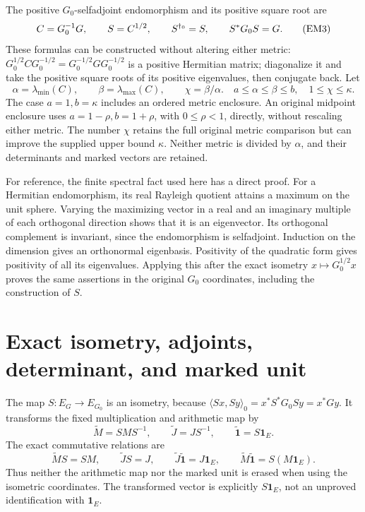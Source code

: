 The positive \(G_0\)-selfadjoint endomorphism and its positive square root are
\begin{equation}
 C=G_0^{-1}G,\qquad S=C^{1/2},\qquad
 S^{\dagger_0}=S,\qquad S^*G_0S=G.
 \tag{EM3}\label{hem:EM3}
\end{equation}
These formulas can be constructed without altering either metric:
\(G_0^{1/2}CG_0^{-1/2}=G_0^{-1/2}GG_0^{-1/2}\) is a positive Hermitian
matrix; diagonalize it and take the positive square roots of its positive
eigenvalues, then conjugate back. Let
\begin{equation}
 \alpha=\lambda_{\min}(C),\qquad\beta=\lambda_{\max}(C),\qquad
 \chi=\beta/\alpha.
 \quad a\le\alpha\le\beta\le b,\quad 1\le\chi\le\kappa.
 \tag{EM4}\label{hem:EM4}
\end{equation}
The case \(a=1,b=\kappa\) includes an ordered metric enclosure.
An original midpoint enclosure uses \(a=1-\rho,b=1+\rho\), with
\(0\le\rho<1\), directly, without rescaling either metric.
The number \(\chi\) retains the full original metric comparison but can
improve the supplied upper bound \(\kappa\). Neither metric is divided
by \(\alpha\), and their determinants and marked vectors are retained.

For reference, the finite spectral fact used here has a direct proof.
For a Hermitian endomorphism, its real Rayleigh quotient attains a maximum
on the unit sphere. Varying the maximizing vector in a real and an imaginary
multiple of each orthogonal direction shows that it is an eigenvector.
Its orthogonal complement is invariant, since the endomorphism is
selfadjoint. Induction on the dimension gives an orthonormal eigenbasis.
Positivity of the quadratic form gives positivity of all its eigenvalues.
Applying this after the exact isometry \(x\mapsto G_0^{1/2}x\) proves the
same assertions in the original \(G_0\) coordinates, including the
construction of \(S\).

\section{Exact isometry, adjoints, determinant, and marked unit}

The map \(S:E_G\to E_{G_0}\) is an isometry, because
\(\langle Sx,Sy\rangle_0=x^*S^*G_0Sy=x^*Gy\).
It transforms the fixed multiplication and arithmetic map by
\begin{equation}
 \widetilde M=SMS^{-1},\qquad
 \widetilde J=JS^{-1},\qquad
 \widetilde{\mathbf1}=S\mathbf1_E.
 \tag{EM5}\label{hem:EM5}
\end{equation}
The exact commutative relations are
\begin{equation}
 \widetilde M S=SM,\qquad
 \widetilde J S=J,\qquad
 \widetilde J\widetilde{\mathbf1}=J\mathbf1_E,\qquad
 \widetilde M\widetilde{\mathbf1}=S(M\mathbf1_E).
 \tag{EM6}\label{hem:EM6}
\end{equation}
Thus neither the arithmetic map nor the marked unit is erased when using
the isometric coordinates. The transformed vector is explicitly
\(S\mathbf1_E\), not an unproved identification with \(\mathbf1_E\).


